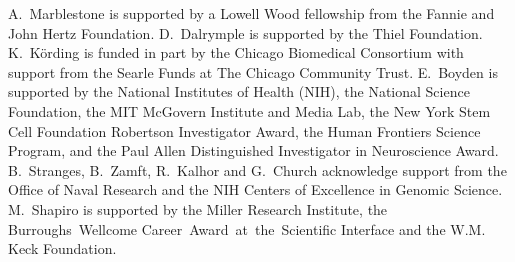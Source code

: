 A.~Marblestone is supported by a Lowell Wood fellowship from the Fannie and John Hertz Foundation.
D.~Dalrymple is supported by the Thiel Foundation.
K.~K\"ording is funded in part by the Chicago Biomedical Consortium with support from the Searle Funds at The Chicago Community Trust.
E.~Boyden is supported by the National Institutes of Health (NIH), the National Science Foundation, the MIT
McGovern Institute and Media Lab, the New York Stem Cell Foundation Robertson Investigator
Award, the Human Frontiers Science Program, and the Paul Allen Distinguished Investigator in
Neuroscience Award.
B.~Stranges, B.~Zamft, R.~Kalhor and G.~Church acknowledge support from the Office of Naval Research and the NIH Centers of Excellence in Genomic Science.
M.~Shapiro is supported by the Miller Research Institute, the Burroughs~Wellcome Career~Award~at~the~Scientific Interface and the W.M. Keck Foundation.

\printbibliography[notsubtype=hide]

